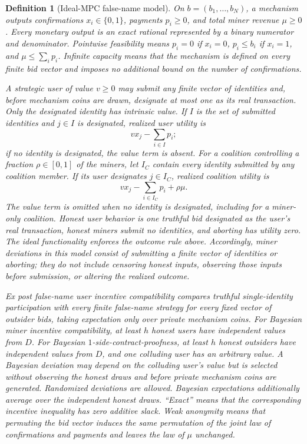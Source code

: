 \documentclass[11pt]{article}
\newtheorem{definition}[lemma]{Definition}
\begin{document}
\begin{definition}[Ideal-MPC false-name model]
\label{def:model}
On $b=(b_1,\ldots,b_N)$, a mechanism outputs confirmations
$x_i\in\{0,1\}$, payments $p_i\ge0$, and total miner revenue $\mu\ge0$.
Every monetary output is an exact rational represented by a binary numerator
and denominator.  Pointwise feasibility means
$p_i=0$ if $x_i=0$, $p_i\le b_i$ if $x_i=1$, and
$\mu\le\sum_i p_i$.  Infinite capacity means that the mechanism is defined
on every finite bid vector and imposes no additional bound on the number of
confirmations.

A strategic user of value $v\ge0$ may submit any finite vector of identities
and, before mechanism coins are drawn, designate at most one as its real
transaction.  Only the designated identity has intrinsic value.  If $I$ is
the set of submitted identities and $j\in I$ is designated, realized user
utility is
\[
v x_j-\sum_{i\in I}p_i;
\]
if no identity is designated, the value term is absent.  For a coalition
controlling a fraction $\rho\in[0,1]$ of the miners, let $I_C$ contain every
identity submitted by any coalition member.  If its user designates
$j\in I_C$, realized coalition utility is
\[
v x_j-\sum_{i\in I_C}p_i+\rho\mu.
\]
The value term is omitted when no identity is designated, including for a
miner-only coalition.  Honest user behavior is one truthful bid designated as
the user's real transaction, honest miners submit no identities, and aborting
has utility zero.  The ideal functionality enforces the outcome rule above.
Accordingly, miner deviations in this model consist of submitting a finite
vector of identities or aborting; they do not include censoring honest inputs,
observing those inputs before submission, or altering the realized outcome.

Ex post false-name user incentive compatibility compares truthful
single-identity participation with every finite false-name strategy for every
fixed vector of outsider bids, taking expectation only over private mechanism
coins.  For Bayesian miner incentive compatibility, at least $h$ honest users
have independent values from $D$.  For Bayesian $1$-side-contract-proofness,
at least $h$ honest outsiders have independent values from $D$, and one
colluding user has an arbitrary value.  A Bayesian deviation may depend on the
colluding user's value but is selected without observing the honest draws and
before private mechanism coins are generated.  Randomized deviations are
allowed.  Bayesian expectations additionally average over the independent
honest draws.  ``Exact'' means that the corresponding incentive inequality has
zero additive slack.  Weak anonymity
means that permuting the bid vector induces the same permutation of the joint
law of confirmations and payments and leaves the law of $\mu$ unchanged.
\end{definition}
\end{document}
